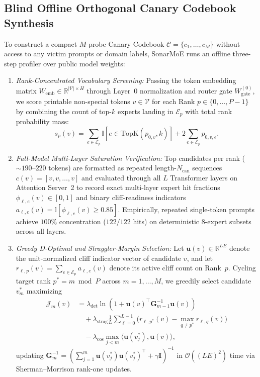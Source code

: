 \documentclass[10pt,journal,compsoc]{IEEEtran}
\def\SM{SonarMoE}%
\theoremstyle{definition}
\theoremstyle{remark}
\newcommand{\SM}{\textsc{SonarMoE}}
\begin{document}
\subsection{Blind Offline Orthogonal Canary Codebook Synthesis}
To construct a compact $M$-probe Canary Codebook $\mathcal{C} = \{c_1, \dots, c_M\}$ without access to any victim prompts or domain labels, \SM{} runs an offline three-step profiler over public model weights:
\begin{enumerate}
  \item \emph{Rank-Concentrated Vocabulary Screening:} Passing the token embedding matrix $W_{\mathrm{emb}} \in \mathbb{R}^{|\mathcal{V}| \times H}$ through Layer~0 normalization and router gate $W_{\mathrm{gate}}^{(0)}$, we score printable non-special tokens $v \in \mathcal{V}$ for each Rank $p \in \{0, \dots, P-1\}$ by combining the count of top-$k$ experts landing in $\mathcal{E}_p$ with total rank probability mass:
  \begin{equation}
    s_p(v) = \sum_{e \in \mathcal{E}_p} \mathbb{I}[e \in \mathrm{TopK}(p_{0, v}, k)] + 2 \sum_{e \in \mathcal{E}_p} p_{0, v, e}.
  \end{equation}
  \item \emph{Full-Model Multi-Layer Saturation Verification:} Top candidates per rank ($\sim 190$--$220$ tokens) are formatted as repeated length-$N_{\mathrm{can}}$ sequences $c(v) = [v, v, \dots, v]$ and evaluated through all $L$ Transformer layers on Attention Server~2 to record exact multi-layer expert hit fractions $\phi_{\ell, e}(v) \in [0, 1]$ and binary cliff-readiness indicators $a_{\ell, e}(v) = \mathbb{I}[\phi_{\ell, e}(v) \ge 0.85]$. Empirically, repeated single-token prompts achieve $100\%$ concentration ($122/122$ hits) on deterministic 8-expert subsets across all layers.
  \item \emph{Greedy D-Optimal and Straggler-Margin Selection:} Let $\mathbf{u}(v) \in \mathbb{R}^{L E}$ denote the unit-normalized cliff indicator vector of candidate $v$, and let $r_{\ell, p}(v) = \sum_{e \in \mathcal{E}_p} a_{\ell, e}(v)$ denote its active cliff count on Rank~$p$. Cycling target rank $p^* = m \bmod P$ across $m = 1, \dots, M$, we greedily select candidate $v_m^*$ maximizing
  \begin{align}\label{eq:d_optimal}
    \mathcal{J}_m(v) &= \lambda_{\mathrm{det}} \ln\!\left(1 + \mathbf{u}(v)^\top \mathbf{G}_{m-1}^{-1} \mathbf{u}(v)\right) \nonumber\\
    &\quad + \lambda_{\mathrm{strag}} \frac{1}{L} \sum_{\ell=0}^{L-1} \Big(r_{\ell, p^*}(v) - \max_{q \neq p^*} r_{\ell, q}(v)\Big) \nonumber\\
    &\quad - \lambda_{\mathrm{cos}} \max_{j < m} \langle \mathbf{u}(v_j^*), \mathbf{u}(v) \rangle,
  \end{align}
  updating $\mathbf{G}_m^{-1} = (\sum_{j=1}^m \mathbf{u}(v_j^*)\mathbf{u}(v_j^*)^\top + \gamma \mathbf{I})^{-1}$ in $\mathcal{O}((LE)^2)$ time via Sherman--Morrison rank-one updates.
\end{enumerate}
\end{document}
